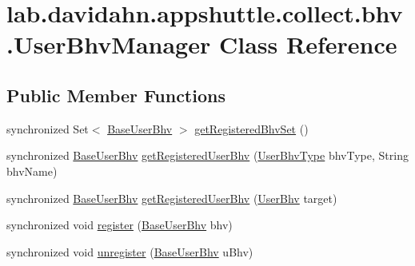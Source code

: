 \hypertarget{classlab_1_1davidahn_1_1appshuttle_1_1collect_1_1bhv_1_1_user_bhv_manager}{\section{lab.\-davidahn.\-appshuttle.\-collect.\-bhv.\-User\-Bhv\-Manager \-Class \-Reference}
\label{classlab_1_1davidahn_1_1appshuttle_1_1collect_1_1bhv_1_1_user_bhv_manager}
}
\subsection*{\-Public \-Member \-Functions}
\begin{DoxyCompactItemize}
\item 
synchronized \-Set$<$ \hyperlink{classlab_1_1davidahn_1_1appshuttle_1_1collect_1_1bhv_1_1_base_user_bhv}{\-Base\-User\-Bhv} $>$ \hyperlink{classlab_1_1davidahn_1_1appshuttle_1_1collect_1_1bhv_1_1_user_bhv_manager_af849bb39702913ce2850bb5ed4c0ea24}{get\-Registered\-Bhv\-Set} ()
\item 
synchronized \hyperlink{classlab_1_1davidahn_1_1appshuttle_1_1collect_1_1bhv_1_1_base_user_bhv}{\-Base\-User\-Bhv} \hyperlink{classlab_1_1davidahn_1_1appshuttle_1_1collect_1_1bhv_1_1_user_bhv_manager_a75593d51cbe273dfb50d6c8cdcc800d7}{get\-Registered\-User\-Bhv} (\hyperlink{enumlab_1_1davidahn_1_1appshuttle_1_1collect_1_1bhv_1_1_user_bhv_type}{\-User\-Bhv\-Type} bhv\-Type, \-String bhv\-Name)
\item 
synchronized \hyperlink{classlab_1_1davidahn_1_1appshuttle_1_1collect_1_1bhv_1_1_base_user_bhv}{\-Base\-User\-Bhv} \hyperlink{classlab_1_1davidahn_1_1appshuttle_1_1collect_1_1bhv_1_1_user_bhv_manager_af047073d063663603ed98473c52fa2e5}{get\-Registered\-User\-Bhv} (\hyperlink{interfacelab_1_1davidahn_1_1appshuttle_1_1collect_1_1bhv_1_1_user_bhv}{\-User\-Bhv} target)
\item 
synchronized void \hyperlink{classlab_1_1davidahn_1_1appshuttle_1_1collect_1_1bhv_1_1_user_bhv_manager_afe610732df069c67ebea01466e0d63e3}{register} (\hyperlink{classlab_1_1davidahn_1_1appshuttle_1_1collect_1_1bhv_1_1_base_user_bhv}{\-Base\-User\-Bhv} bhv)
\item 
synchronized void \hyperlink{classlab_1_1davidahn_1_1appshuttle_1_1collect_1_1bhv_1_1_user_bhv_manager_af3184176275b319f1aa75074688c2169}{unregister} (\hyperlink{classlab_1_1davidahn_1_1appshuttle_1_1collect_1_1bhv_1_1_base_user_bhv}{\-Base\-User\-Bhv} u\-Bhv)
\end{DoxyCompactItemize}
